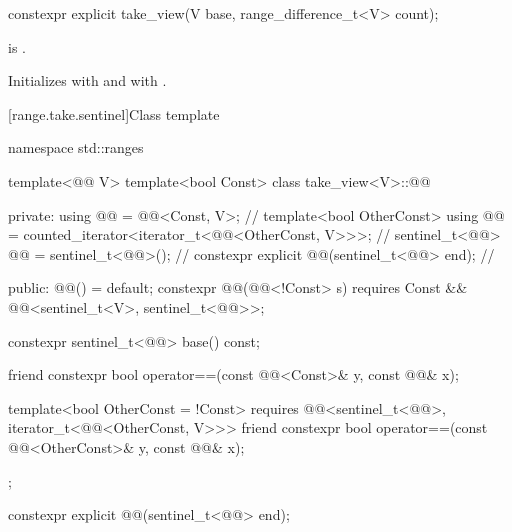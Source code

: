 %
\begin{itemdecl}
constexpr explicit take_view(V base, range_difference_t<V> count);
\end{itemdecl}

\begin{itemdescr}
\pnum
\expects
{} is .

\pnum
\effects
Initializes  with  and
 with .
\end{itemdescr}

[range.take.sentinel]{Class template }

%
\begin{codeblock}
namespace std::ranges {
  template<@@ V>
  template<bool Const>
  class take_view<V>::@@ {
  private:
    using @@ = @@<Const, V>;                                     // \expos
    template<bool OtherConst>
      using @@ = counted_iterator<iterator_t<@@<OtherConst, V>>>;  // \expos
    sentinel_t<@@> @@ = sentinel_t<@@>();                             // \expos
    constexpr explicit @@(sentinel_t<@@> end);                      // \expos

  public:
    @@() = default;
    constexpr @@(@@<!Const> s)
      requires Const && @@<sentinel_t<V>, sentinel_t<@@>>;

    constexpr sentinel_t<@@> base() const;

    friend constexpr bool operator==(const @@<Const>& y, const @@& x);

    template<bool OtherConst = !Const>
      requires @@<sentinel_t<@@>, iterator_t<@@<OtherConst, V>>>
    friend constexpr bool operator==(const @@<OtherConst>& y, const @@& x);
  };
}
\end{codeblock}

%
\begin{itemdecl}
constexpr explicit @@(sentinel_t<@@> end);
\end{itemdecl}

